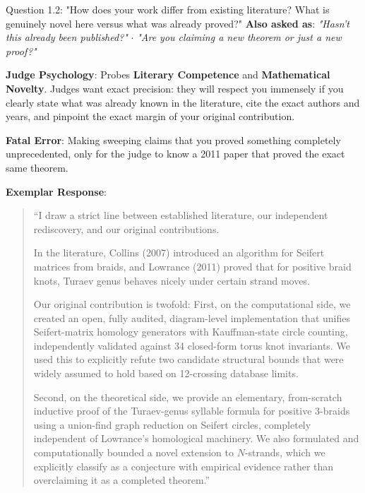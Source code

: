 \documentclass[11pt,letterpaper]{article}
\begin{document}
\vspace{1em}

\begin{questionbox}{Question 1.2: "How does your work differ from existing literature? What is genuinely novel here versus what was already proved?"}
\textbf{Also asked as}: \textit{"Hasn't this already been published?"} $\cdot$ \textit{"Are you claiming a new theorem or just a new proof?"}
\end{questionbox}

\begin{strategybox}
\textbf{Judge Psychology}: Probes \textbf{Literary Competence} and \textbf{Mathematical Novelty}. Judges want exact precision: they will respect you immensely if you clearly state what was already known in the literature, cite the exact authors and years, and pinpoint the exact margin of your original contribution.
\end{strategybox}

\begin{trapbox}
\textbf{Fatal Error}: Making sweeping claims that you proved something completely unprecedented, only for the judge to know a 2011 paper that proved the exact same theorem.
\end{trapbox}

\begin{exemplarbox}
\textbf{Exemplar Response}:
\begin{quote}
``I draw a strict line between established literature, our independent rediscovery, and our original contributions.

In the literature, Collins (2007) introduced an algorithm for Seifert matrices from braids, and Lowrance (2011) proved that for positive braid knots, Turaev genus behaves nicely under certain strand moves. 

Our original contribution is twofold:
First, on the computational side, we created an open, fully audited, diagram-level implementation that unifies Seifert-matrix homology generators with Kauffman-state circle counting, independently validated against 34 closed-form torus knot invariants. We used this to explicitly refute two candidate structural bounds that were widely assumed to hold based on 12-crossing database limits.

Second, on the theoretical side, we provide an elementary, from-scratch inductive proof of the Turaev-genus syllable formula for positive 3-braids using a union-find graph reduction on Seifert circles, completely independent of Lowrance's homological machinery. We also formulated and computationally bounded a novel extension to $N$-strands, which we explicitly classify as a conjecture with empirical evidence rather than overclaiming it as a completed theorem.''
\end{quote}
\end{exemplarbox}
\end{document}
